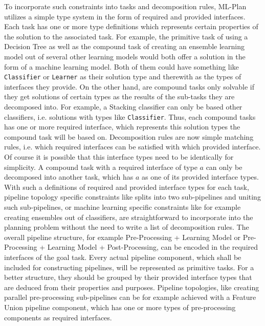 To incorporate such constraints into tasks and decomposition rules, ML-Plan utilizes a simple type system in the form of required and provided interfaces.
Each task has one or more type definitions which represents certain properties of the solution to the associated task.
For example, the primitive task of using a Decision Tree as well as the compound task of creating an ensemble learning model out of several other learning models would both offer a solution in the form of a machine learning model.
Both of them could have something like \texttt{Classifier} or \texttt{Learner} as their solution type and therewith as the types of interfaces they provide.\newline
On the other hand, are compound tasks only solvable if they get solutions of certain types as the results of the sub-tasks they are decomposed into.
For example, a Stacking classifier can only be based other classifiers, i.e. solutions with types like \texttt{Classifier}.
Thus, each compound tasks has one or more required interface, which represents this solution types the compound task will be based on.\newline
Decomposition rules are now simple matching rules, i.e. which required interfaces can be satisfied with which provided interface.
Of course it is possible that this interface types need to be identically for simplicity.
A compound task with a required interface of type $a$ can only be decomposed into another task, which has $a$ as one of its provided interface types.
With such a definitions of required and provided interface types for each task, pipeline topology specific constraints like splits into two sub-pipelines and uniting such sub-pipelines, or machine learning specific constraints like for example creating ensembles out of classifiers, are straightforward to incorporate into the planning problem without the need to write a list of decomposition rules.\newline
The overall pipeline structure, for example Pre-Processing + Learning Model or Pre-Processing + Learning Model + Post-Processing, can be encoded in the required interfaces of the goal task.
Every actual pipeline component, which shall be included for constructing pipelines, will be represented as primitive tasks.
For a better structure, they should be grouped by their provided interface types that are deduced from their properties and purposes.
Pipeline topologies, like creating parallel pre-processing sub-pipelines can be for example achieved with a Feature Union pipeline component, which has one or more types of pre-processing components as required interfaces.
